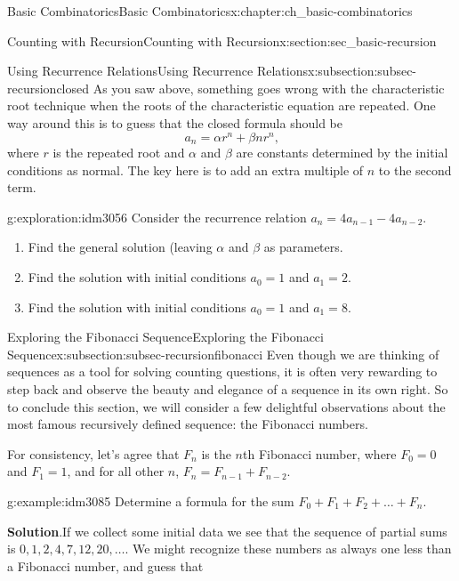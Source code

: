 \documentclass[oneside,10pt,]{book}
\numberwithin{equation}{chapter}
\begin{document}
\begin{chapterptx}{Basic Combinatorics}{}{Basic Combinatorics}{}{}{x:chapter:ch_basic-combinatorics}
\begin{sectionptx}{Counting with Recursion}{}{Counting with Recursion}{}{}{x:section:sec_basic-recursion}
\begin{subsectionptx}{Using Recurrence Relations}{}{Using Recurrence Relations}{}{}{x:subsection:subsec-recursionclosed}
As you saw above, something goes wrong with the characteristic root technique when the roots of the characteristic equation are repeated.  One way around this is to guess that the closed formula should be%
\begin{equation*}
a_n = \alpha r^n + \beta nr^n\text{,}
\end{equation*}
where \(r\) is the repeated root and \(\alpha\) and \(\beta\) are constants determined by the initial conditions as normal. The key here is to add an extra multiple of \(n\) to the second term.%
\begin{exploration}{}{g:exploration:idm3056}%
Consider the recurrence relation \(a_n = 4a_{n-1} - 4a_{n-2}\).%
\begin{enumerate}[font=\bfseries,label=(\alph*),ref=\alph*]
\item{}Find the general solution (leaving \(\alpha\) and \(\beta\) as parameters.%
\item{}Find the solution with initial conditions \(a_0 = 1\) and \(a_1 = 2\).%
\item{}Find the solution with initial conditions \(a_0 = 1\) and \(a_1 = 8\).%
\end{enumerate}
\end{exploration}
\end{subsectionptx}
%
%
\typeout{************************************************}
\typeout{************************************************}
%
\begin{subsectionptx}{Exploring the Fibonacci Sequence}{}{Exploring the Fibonacci Sequence}{}{}{x:subsection:subsec-recursionfibonacci}
Even though we are thinking of sequences as a tool for solving counting questions, it is often very rewarding to step back and observe the beauty and elegance of a sequence in its own right.  So to conclude this section, we will consider a few delightful observations about the most famous recursively defined sequence: the Fibonacci numbers.%
\par
For consistency, let's agree that \(F_n\) is the \(n\)th Fibonacci number, where \(F_0 = 0\) and \(F_1 = 1\), and for all other \(n\), \(F_n = F_{n-1} + F_{n-2}\).%
\begin{example}{}{g:example:idm3085}%
Determine a formula for the sum \(F_{0} + F_{1} + F_{2} + \ldots + F_{n}\).%
\par\smallskip%
\noindent\textbf{Solution}.\hypertarget{g:solution:idm3089}{}\quad{}If we collect some initial data we see that the sequence of partial sums is \(0, 1, 2, 4, 7, 12, 20, \ldots\).  We might recognize these numbers as always one less than a Fibonacci number, and guess that%

\end{example}
\end{subsectionptx}
\end{sectionptx}
\end{chapterptx}
\end{document}
